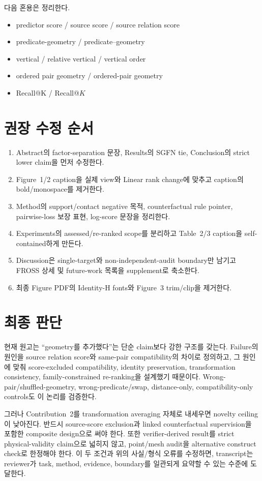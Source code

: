 \documentclass[11pt]{article}
\begin{document}
다음 혼용은 정리한다.

\begin{itemize}[leftmargin=2em]
    \item predictor score / source score / source relation score
    \item predicate-geometry / predicate--geometry
    \item vertical / relative vertical / vertical order
    \item ordered pair geometry / ordered-pair geometry
    \item Recall@K / Recall@$K$
\end{itemize}

\section{권장 수정 순서}

\begin{enumerate}[leftmargin=2em]
    \item Abstract의 factor-separation 문장, Results의 SGFN tie, Conclusion의 strict
    lower claim을 먼저 수정한다.
    \item Figure~1/2 caption을 실제 view와 Linear rank change에 맞추고 caption의
    bold/monospace를 제거한다.
    \item Method의 support/contact negative 목적, counterfactual rule pointer,
    pairwise-loss 보장 표현, log-score 문장을 정리한다.
    \item Experiments의 assessed/re-ranked scope를 분리하고 Table~2/3 caption을
    self-contained하게 만든다.
    \item Discussion은 single-target와 non-independent-audit boundary만 남기고
    FROSS 상세 및 future-work 목록을 supplement로 축소한다.
    \item 최종 Figure PDF의 Identity-H fonts와 Figure~3 trim/clip을 제거한다.
\end{enumerate}

\section{최종 판단}

현재 원고는 ``geometry를 추가했다''는 단순 claim보다 강한 구조를 갖는다. Failure의
원인을 source relation score와 same-pair compatibility의 차이로 정의하고, 그 원인에
맞춰 score-excluded compatibility, identity preservation, transformation consistency,
family-constrained re-ranking을 설계했기 때문이다. Wrong-pair/shuffled-geometry,
wrong-predicate/swap, distance-only, compatibility-only controls도 이 논리를 검증한다.

그러나 Contribution~2를 transformation averaging 자체로 내세우면 novelty ceiling이
낮아진다. 반드시 source-score exclusion과 linked counterfactual supervision을 포함한
composite design으로 써야 한다. 또한 verifier-derived result를 strict physical-validity
claim으로 넓히지 않고, point/mesh audit을 alternative construct check로 한정해야 한다.
이 두 조건과 위의 사실/형식 오류를 수정하면, transcript는 reviewer가 task, method,
evidence, boundary를 일관되게 요약할 수 있는 수준에 도달한다.
\end{document}
